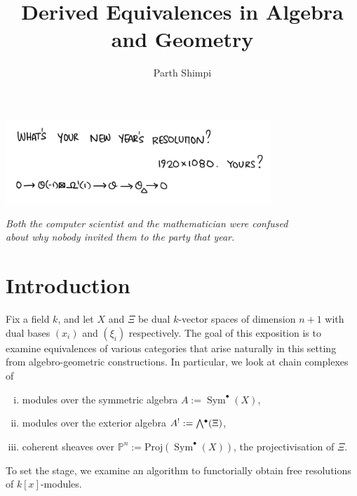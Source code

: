 \documentclass[a4paper]{article}
\title{Derived Equivalences in Algebra and Geometry}
\author{Parth Shimpi}
\date{Easter 2022 \\ \vspace{2em}\small{Essay submitted in partial fulfillment of the requirements for \\ Master of
Mathematics degree at the University of Cambridge. \\ 
\vspace{3em}\hrule}}
\theoremstyle{definition}
\theoremstyle{remark}
\newcommand{\Exter}{\mathchoice{{\textstyle\bigwedge}}%
    {{\bigwedge}}%
    {{\textstyle\wedge}}%
    {{\scriptstyle\wedge}}}
\DeclareMathOperator{\Sym}{\text{Sym}}
\DeclareMathOperator{\exterior}{\Exter^\bullet}
\newcommand{\Proj}{\ensuremath{\text{Proj}}}
\newcommand{\Pn}{\ensuremath{{\mathbb{P}^n}}}
\begin{document}
 


\maketitle
\begin{center}
    \includegraphics[width=10cm]{Untitled_Artwork 3.png}
    
    \textit{Both the computer scientist and the mathematician were confused
    \\about why nobody invited them to the party that year.}
\end{center}
\vspace{5em}

\tableofcontents 
\pagebreak

\section*{Introduction}

Fix a field \(k\), and let \(X\) and \(\Xi\) be dual \(k\)-vector spaces of
dimension \(n+1\) with dual bases \((x_i)\) and \((\xi_i)\) respectively. The goal
of this exposition is to examine equivalences of various categories that arise
naturally in this setting from algebro-geometric constructions. In particular,
we look at chain complexes of 
\begin{enumerate}[(i)]
    \item modules over the symmetric algebra \(A:=
        \Sym^\bullet(X)\),
    \item modules over the exterior algebra \(A^!:= \exterior(\Xi)\),
    \item coherent sheaves over \(\Pn := \Proj(\Sym^\bullet (X))\), the
        projectivisation of \(\Xi\).
\end{enumerate}

To set the stage, we examine an algorithm to functorially obtain free
resolutions of \(k[x]\)-modules.
\end{document}

